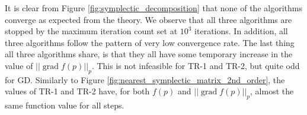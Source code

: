 It is clear from Figure \ref{fig:symplectic_decomposition} that none of the algorithms converge as expected from the theory. We observe that all three algorithms are stopped by the maximum iteration count set at $10^{3}$ iterations. In addition, all three algorithms follow the pattern of very low convergence rate. The last thing all three algorithms share, is that they all have some temporary increase in the value of $\lvert \lvert \operatorname{grad}f(p) \rvert \rvert_{p}$. This is not infeasible for TR-1 and TR-2, but quite odd for GD. Similarly to Figure \ref{fig:nearest_symplectic_matrix_2nd_order}, the values of TR-1 and TR-2 have, for both $f(p)$ and $\lvert \lvert \operatorname{grad}f(p) \rvert \rvert_{p}$, almost the same function value for all steps. 